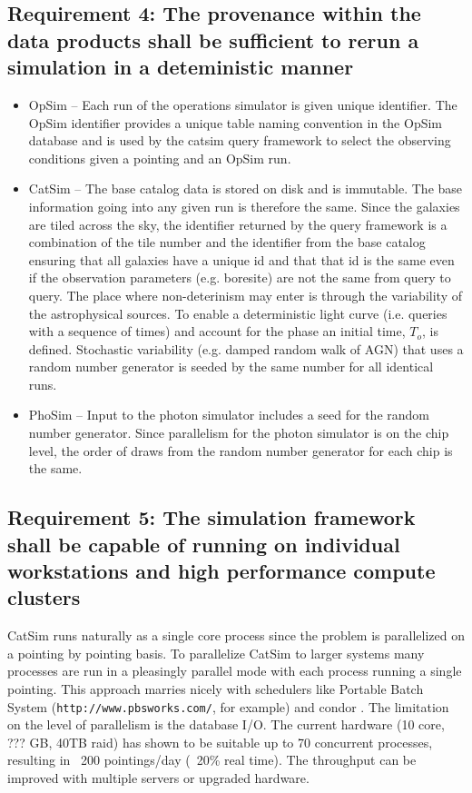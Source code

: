 \documentclass[]{article}
\begin{document}
{\subsection{Requirement 4: The provenance within the data products shall be sufficient to rerun a simulation in a 
deteministic manner}
\begin{itemize}
\item OpSim -- Each run of the operations simulator is given unique identifier.  
The OpSim identifier provides a unique table naming convention in the OpSim database and is used by the catsim
query framework to select the observing conditions given a pointing and an OpSim run.
\item CatSim -- The base catalog data is stored on disk and is immutable. The base information
going into any given run is therefore the same.  Since the galaxies are tiled across the sky, the identifier returned
by the query framework is a combination of the tile number and the identifier from the base catalog ensuring that
all galaxies have a unique id and that that id is the same even if the observation parameters (e.g. boresite) are 
not the same from query to query.  The place where non-deterinism may enter is through the variability of the astrophysical
sources.
To enable a deterministic light curve (i.e. queries with a sequence of times) and account for the phase
an initial time, $T_o$, is defined.
Stochastic variability (e.g. damped random walk of AGN) that uses a random number generator is seeded by the same number for all identical runs.
\item PhoSim -- Input to the photon simulator includes a seed for the random number generator.  Since parallelism for
the photon simulator is on the chip level, the order of draws from the random number generator for each chip is the same.
\end{itemize}

\subsection{Requirement 5: The simulation framework shall be capable of running on individual workstations 
and high performance compute clusters}
CatSim runs naturally as a single core process since the problem is parallelized on a pointing by pointing basis.
To parallelize CatSim to larger systems many processes are run in a pleasingly parallel mode with each process running
a single pointing.  This approach marries nicely with schedulers like Portable Batch System ({\tt http://www.pbsworks.com/}, for example) 
and condor \citep{condor}.  
The limitation on the level of parallelism 
is the database I/O.  The current hardware (10 core, ??? GB, 40TB raid) has shown to be suitable up to 70 concurrent processes, 
resulting in ~200 pointings/day (~20\% real time).  The throughput can be improved with multiple servers or upgraded hardware.

}
\end{document}
